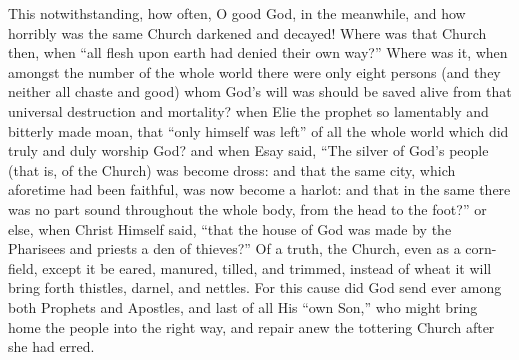 This notwithstanding, how often, O good God, in the meanwhile, and
how horribly was the same Church darkened and decayed! Where was
that Church then, when “all flesh upon earth had denied their
own way?” Where was it, when amongst the number of the whole
world there were only eight persons (and they neither all chaste and
good) whom God’s will was should be saved alive from that universal
destruction and mortality? when Elie the prophet so lamentably and bitterly
made moan, that “only himself was left” of all the whole
world which did truly and duly worship God? and when Esay said, “The
silver of God’s people (that is, of the Church) was become dross:
and that the same city, which aforetime had been faithful, was now become
a harlot: and that in the same there was no part sound throughout the
whole body, from the head to the foot?” or else, when Christ Himself
said, “that the house of God was made by the Pharisees and priests
a den of thieves?” Of a truth, the Church, even as a corn-field,
except it be eared, manured, tilled, and trimmed, instead of wheat it
will bring forth thistles, darnel, and nettles. For this cause
did God send ever among both Prophets and Apostles, and
last of all His “own Son,” who might bring home the people
into the right way, and repair anew the tottering Church after she had
erred.

